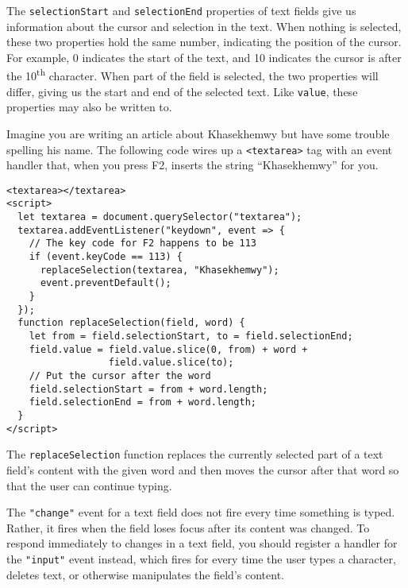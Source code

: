 The \lstinline`selectionStart` and \lstinline`selectionEnd` properties of text fields give us information about the cursor and selection in the text. When nothing is selected, these two properties hold the same number, indicating the position of the cursor. For example, 0 indicates the start of the text, and 10 indicates the cursor is after the 10\textsuperscript{th} character. When part of the field is selected, the two properties will differ, giving us the start and end of the selected text. Like \lstinline`value`, these properties may also be written to.

Imagine you are writing an article about Khasekhemwy but have some trouble spelling his name. The following code wires up a \lstinline`<textarea>` tag with an event handler that, when you press F2, inserts the string ``Khasekhemwy'' for you.

\begin{lstlisting}
<textarea></textarea>
<script>
  let textarea = document.querySelector("textarea");
  textarea.addEventListener("keydown", event => {
    // The key code for F2 happens to be 113
    if (event.keyCode == 113) {
      replaceSelection(textarea, "Khasekhemwy");
      event.preventDefault();
    }
  });
  function replaceSelection(field, word) {
    let from = field.selectionStart, to = field.selectionEnd;
    field.value = field.value.slice(0, from) + word +
                  field.value.slice(to);
    // Put the cursor after the word
    field.selectionStart = from + word.length;
    field.selectionEnd = from + word.length;
  }
</script>
\end{lstlisting}
\noindent{}

The \lstinline`replaceSelection` function replaces the currently selected part of a text field's content with the given word and then moves the cursor after that word so that the user can continue typing.

The \lstinline`"change"` event for a text
field does not fire every time something is typed. Rather, it fires when the field loses focus after its content was changed. To respond immediately to changes in a text field, you should register a handler for the \lstinline`"input"` event instead, which fires for every time the user types a character, deletes text, or otherwise manipulates the field's content.

